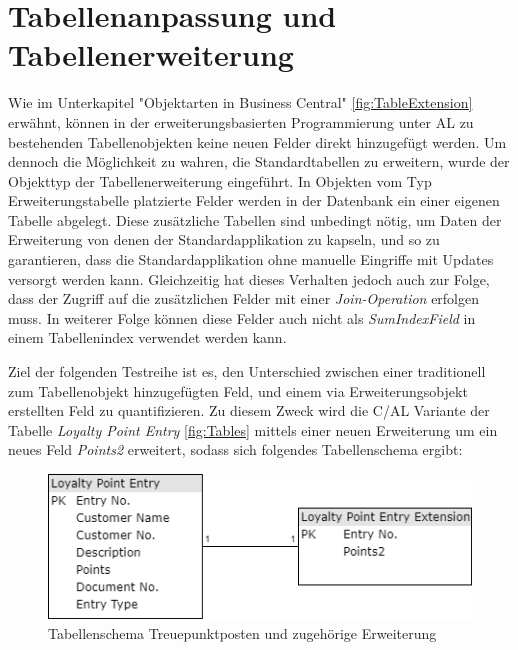 \section{Tabellenanpassung und Tabellenerweiterung}
Wie im Unterkapitel "Objektarten in Business Central" \ref{fig:TableExtension} erwähnt, können in der erweiterungsbasierten Programmierung unter AL zu bestehenden Tabellenobjekten keine neuen Felder direkt hinzugefügt werden. Um  dennoch die Möglichkeit zu wahren, die Standardtabellen zu erweitern, wurde der Objekttyp der Tabellenerweiterung eingeführt. In Objekten vom Typ Erweiterungstabelle platzierte Felder werden in der Datenbank ein einer eigenen Tabelle abgelegt. Diese zusätzliche Tabellen sind unbedingt nötig, um Daten der Erweiterung von denen der Standardapplikation zu kapseln, und so zu garantieren, dass die Standardapplikation ohne manuelle Eingriffe mit Updates versorgt werden kann. Gleichzeitig hat dieses Verhalten jedoch auch zur Folge, dass der Zugriff auf die zusätzlichen Felder mit einer \textit{Join-Operation} erfolgen muss. In weiterer Folge können diese Felder auch nicht als \textit{SumIndexField} in einem Tabellenindex verwendet werden kann. 

Ziel der folgenden Testreihe ist es, den Unterschied zwischen einer traditionell zum Tabellenobjekt hinzugefügten Feld, und einem via Erweiterungsobjekt erstellten Feld zu quantifizieren. Zu diesem Zweck wird die C/AL Variante der Tabelle \textit{Loyalty Point Entry} \ref{fig:Tables} mittels einer neuen Erweiterung um ein neues Feld \textit{Points2} erweitert, sodass sich folgendes Tabellenschema ergibt:

\begin{figure}[H]
	\centering
	\includegraphics[width=130mm]{images/Test2}
	\caption{Tabellenschema Treuepunktposten und zugehörige Erweiterung}
	\label{fig:Test2Schema}
\end{figure}

